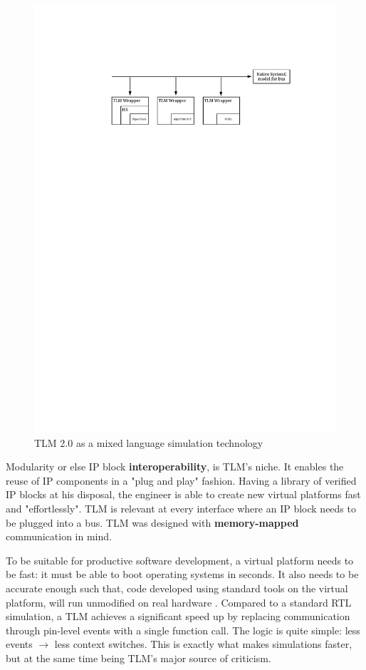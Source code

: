 \documentclass[11pt]{article}
\begin{document}
\begin{figure}[htbp]
\centering
\includegraphics[width=.9\linewidth]{Figures/mixedSimulation.pdf}
\caption{\label{fig:org9ca493a}
TLM 2.0 as a mixed language simulation technology}
\end{figure}

Modularity or else IP block \textbf{interoperability}, is TLM's niche.
It enables the reuse of IP components in a "plug and play" fashion.
Having a library of verified IP blocks at his disposal, the engineer is able to create new virtual platforms fast and "effortlessly".
TLM is relevant at every interface where an IP block needs to be plugged into a bus.
TLM was designed with \textbf{memory-mapped} communication in mind.

To be suitable for productive software development, a virtual platform needs to be fast: it must be able to boot operating systems in seconds.
It also needs to be accurate enough such that, code developed using standard tools on the virtual platform, will run unmodified on real hardware \cite{Leupers2010}. 
Compared to a standard RTL simulation, a TLM achieves a significant speed up by replacing communication through pin-level events with a single function call.
The logic is quite simple: less events \(\rightarrow\) less context switches.
This is exactly what makes simulations faster, but at the same time being TLM's major source of criticism.
\end{document}
